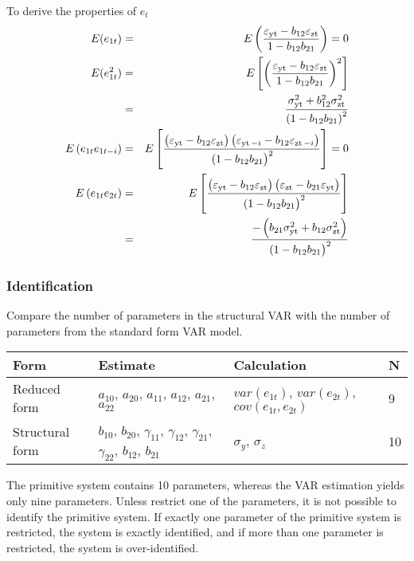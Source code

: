 To derive the properties of $e_t$
\begin{eqnarray*}
  E (e_{1 t}) & = & E \left( \frac{\varepsilon_{\operatorname{yt}} - b_{12}
  \varepsilon_{\operatorname{zt}}}{1 - b_{12} b_{21}} \right) = 0\\
  E (e_{1 t}^2) & = & E \left[ \left( \frac{\varepsilon_{\operatorname{yt}} - b_{12}
  \varepsilon_{\operatorname{zt}}}{1 - b_{12} b_{21}} \right)^2 \right]\\
  & = & \frac{\sigma^2_{\operatorname{yt}} + b^2_{12} \sigma^2_{\operatorname{zt}}}{\left( 1
  - b_{12} b_{21} \right)^2}\\
  E \left( e_{1 t} e_{1 t - i} \right) & = & E \left[ \frac{\left(
  \varepsilon_{\operatorname{yt}} - b_{12} \varepsilon_{\operatorname{zt}} \right) \left(
  \varepsilon_{\operatorname{yt} - i} - b_{12} \varepsilon_{\operatorname{zt} - i}
  \right)}{\left. ( 1 - b_{12} b_{21} \right)^2} \right] = 0\\
  E \left( e_{1 t} e_{2 t} \right) & = & E \left[ \frac{\left(
  \varepsilon_{\operatorname{yt}} - b_{12} \varepsilon_{\operatorname{zt}} \right) \left(
  \varepsilon_{\operatorname{zt}} - b_{21} \varepsilon_{\operatorname{yt}} \right)}{\left. ( 1
  - b_{12} b_{21} \right)^2} \right]\\
  & = & \frac{- \left( b_{21} \sigma^2_{\operatorname{yt}} + b_{12}
  \sigma^2_{\operatorname{zt}} \right)}{\left. ( 1 - b_{12} b_{21} \right)^2}
\end{eqnarray*}

\subsubsection{Identification}
Compare the number of parameters in the structural VAR with the number of parameters from the standard form VAR model. 
\begin{center}
\begin{tabular}{llll}
\hline
Form&Estimate&Calculation&N\\\hline
Reduced form&$a_{10}$, $a_{20}$, $a_{11}$, $a_{12}$, $a_{21}$, $a_{22}$&$var(e_{1t})$, $var(e_{2t})$, $cov(e_{1t}, e_{2t})$&9\\
Structural form&$b_{10}$, $b_{20}$, $\gamma_{11}$, $\gamma_{12}$, $\gamma_{21}$, $\gamma_{22}$, $b_{12}$, $b_{21}$&$\sigma_y$, $\sigma_z$&10\\
\hline
\end{tabular}
\end{center}

The primitive system contains 10 parameters, whereas the VAR estimation yields only nine parameters. Unless restrict one of the parameters, it is not possible to identify the primitive system. If exactly one parameter of the primitive system is restricted, the system is exactly identified, and if more than one parameter is restricted, the system is over-identified. 


